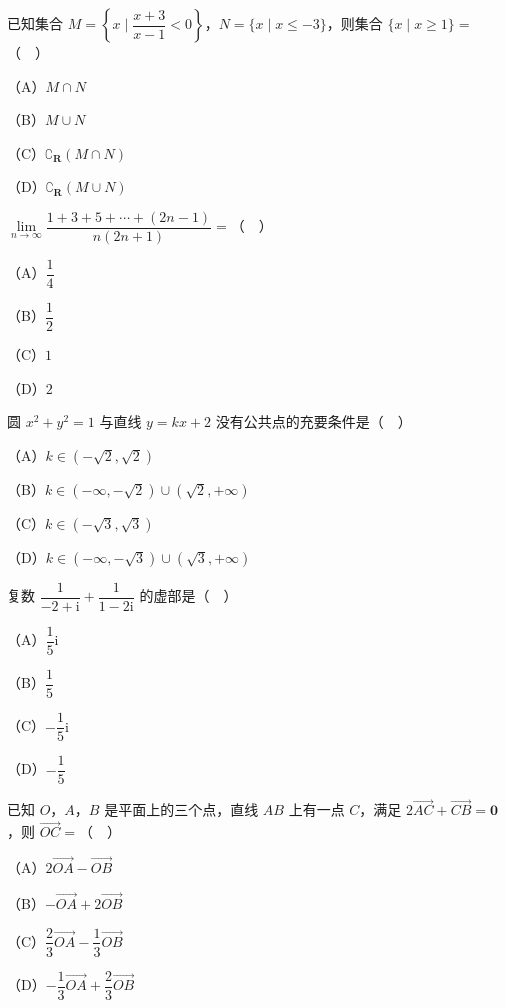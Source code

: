 


\begin{question}
已知集合 $M=\left\{x\mid \dfrac{x+3}{x-1}<0\right\}$，$N=\{x\mid x\leqslant-3\}$，则集合 $\{x\mid x\geqslant1\}=$（　）

（A）$M\cap N$

（B）$M\cup N$

（C）$\complement_{\mathbf R}(M\cap N)$

（D）$\complement_{\mathbf R}(M\cup N)$

\end{question}
\begin{question}
$\lim\limits_{n\to\infty}\dfrac{1+3+5+\cdots+(2n-1)}{n(2n+1)}=$（　）

（A）$\dfrac14$

（B）$\dfrac12$

（C）$1$

（D）$2$

\end{question}
\begin{question}
圆 $x^2+y^2=1$ 与直线 $y=kx+2$ 没有公共点的充要条件是（　）

（A）$k\in(-\sqrt2,\sqrt2)$

（B）$k\in(-\infty,-\sqrt2)\cup(\sqrt2,+\infty)$

（C）$k\in(-\sqrt3,\sqrt3)$

（D）$k\in(-\infty,-\sqrt3)\cup(\sqrt3,+\infty)$

\end{question}
\begin{question}
复数 $\dfrac1{-2+\mathrm i}+\dfrac1{1-2\mathrm i}$ 的虚部是（　）

（A）$\dfrac15\mathrm i$

（B）$\dfrac15$

（C）$-\dfrac15\mathrm i$

（D）$-\dfrac15$

\end{question}
\begin{question}
已知 $O$，$A$，$B$ 是平面上的三个点，直线 $AB$ 上有一点 $C$，满足 $2\overrightarrow{AC}+\overrightarrow{CB}=\boldsymbol 0$，则 $\overrightarrow{OC}=$（　）

（A）$2\overrightarrow{OA}-\overrightarrow{OB}$

（B）$-\overrightarrow{OA}+2\overrightarrow{OB}$

（C）$\dfrac23\overrightarrow{OA}-\dfrac13\overrightarrow{OB}$

（D）$-\dfrac13\overrightarrow{OA}+\dfrac23\overrightarrow{OB}$

\end{question}
